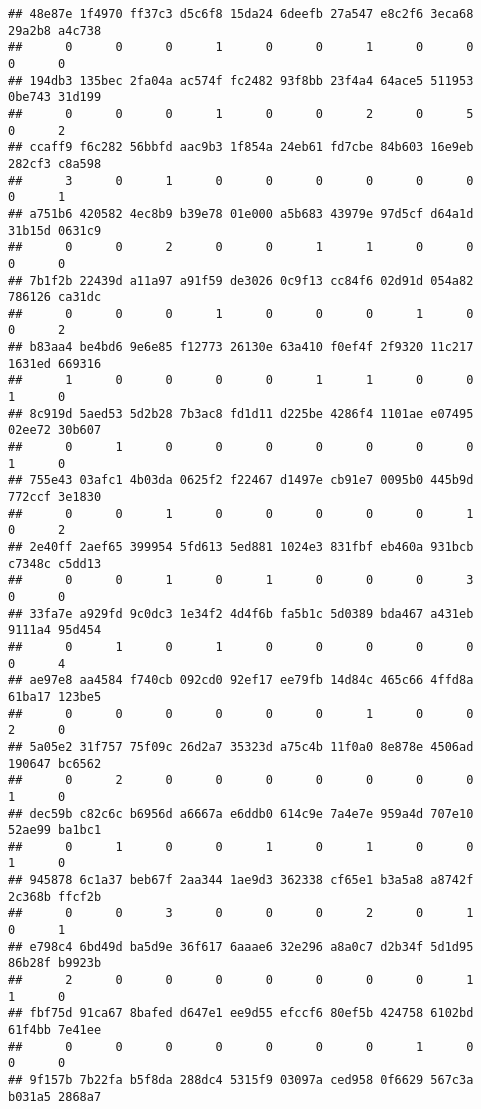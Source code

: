 \documentclass[
]{article}
\begin{document}
\begin{verbatim}
## 48e87e 1f4970 ff37c3 d5c6f8 15da24 6deefb 27a547 e8c2f6 3eca68 29a2b8 a4c738 
##      0      0      0      1      0      0      1      0      0      0      0 
## 194db3 135bec 2fa04a ac574f fc2482 93f8bb 23f4a4 64ace5 511953 0be743 31d199 
##      0      0      0      1      0      0      2      0      5      0      2 
## ccaff9 f6c282 56bbfd aac9b3 1f854a 24eb61 fd7cbe 84b603 16e9eb 282cf3 c8a598 
##      3      0      1      0      0      0      0      0      0      0      1 
## a751b6 420582 4ec8b9 b39e78 01e000 a5b683 43979e 97d5cf d64a1d 31b15d 0631c9 
##      0      0      2      0      0      1      1      0      0      0      0 
## 7b1f2b 22439d a11a97 a91f59 de3026 0c9f13 cc84f6 02d91d 054a82 786126 ca31dc 
##      0      0      0      1      0      0      0      1      0      0      2 
## b83aa4 be4bd6 9e6e85 f12773 26130e 63a410 f0ef4f 2f9320 11c217 1631ed 669316 
##      1      0      0      0      0      1      1      0      0      1      0 
## 8c919d 5aed53 5d2b28 7b3ac8 fd1d11 d225be 4286f4 1101ae e07495 02ee72 30b607 
##      0      1      0      0      0      0      0      0      0      1      0 
## 755e43 03afc1 4b03da 0625f2 f22467 d1497e cb91e7 0095b0 445b9d 772ccf 3e1830 
##      0      0      1      0      0      0      0      0      1      0      2 
## 2e40ff 2aef65 399954 5fd613 5ed881 1024e3 831fbf eb460a 931bcb c7348c c5dd13 
##      0      0      1      0      1      0      0      0      3      0      0 
## 33fa7e a929fd 9c0dc3 1e34f2 4d4f6b fa5b1c 5d0389 bda467 a431eb 9111a4 95d454 
##      0      1      0      1      0      0      0      0      0      0      4 
## ae97e8 aa4584 f740cb 092cd0 92ef17 ee79fb 14d84c 465c66 4ffd8a 61ba17 123be5 
##      0      0      0      0      0      0      1      0      0      2      0 
## 5a05e2 31f757 75f09c 26d2a7 35323d a75c4b 11f0a0 8e878e 4506ad 190647 bc6562 
##      0      2      0      0      0      0      0      0      0      1      0 
## dec59b c82c6c b6956d a6667a e6ddb0 614c9e 7a4e7e 959a4d 707e10 52ae99 ba1bc1 
##      0      1      0      0      1      0      1      0      0      1      0 
## 945878 6c1a37 beb67f 2aa344 1ae9d3 362338 cf65e1 b3a5a8 a8742f 2c368b ffcf2b 
##      0      0      3      0      0      0      2      0      1      0      1 
## e798c4 6bd49d ba5d9e 36f617 6aaae6 32e296 a8a0c7 d2b34f 5d1d95 86b28f b9923b 
##      2      0      0      0      0      0      0      0      1      1      0 
## fbf75d 91ca67 8bafed d647e1 ee9d55 efccf6 80ef5b 424758 6102bd 61f4bb 7e41ee 
##      0      0      0      0      0      0      0      1      0      0      0 
## 9f157b 7b22fa b5f8da 288dc4 5315f9 03097a ced958 0f6629 567c3a b031a5 2868a7 

\end{verbatim}
\end{document}
